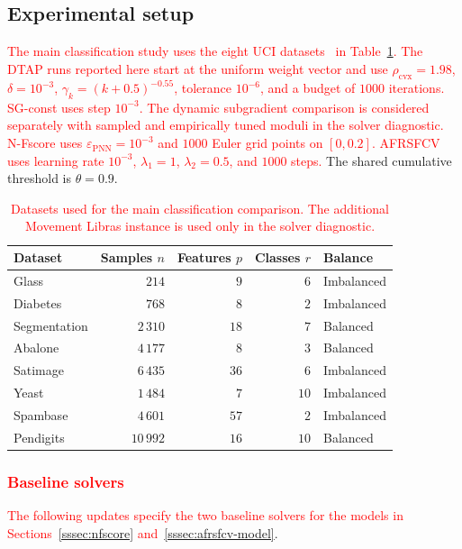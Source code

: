 \documentclass[]{interact}
\theoremstyle{plain}
\theoremstyle{definition}
\theoremstyle{remark}
\newcommand{\cvx}{\mathrm{cvx}}
\begin{document}
\subsection{Experimental setup}\label{ssec:setup}
\leavevmode\textcolor{red}{The main classification study uses the eight UCI datasets~\citep{kelly2023uci} in Table~\ref{tab:datasets}. The DTAP runs reported here start at the uniform weight vector and use $\rho_{\cvx}=1.98$, $\delta=10^{-3}$, $\gamma_k=(k+0.5)^{-0.55}$, tolerance $10^{-6}$, and a budget of $1000$ iterations. SG-const uses step $10^{-3}$. The dynamic subgradient comparison is considered separately with sampled and empirically tuned moduli in the solver diagnostic. N-Fscore uses $\varepsilon_{\mathrm{PNN}}=10^{-3}$ and $1000$ Euler grid points on $[0,0.2]$. AFRSFCV uses learning rate $10^{-3}$, $\lambda_1=1$, $\lambda_2=0.5$, and $1000$ steps.} The shared cumulative threshold is $\theta=0.9$.

\begin{table}[htbp]
\centering
\caption{\textcolor{red}{Datasets used for the main classification comparison. The additional Movement Libras instance is used only in the solver diagnostic.}}\label{tab:datasets}
\begin{tabular}{lrrrl}
\toprule
Dataset      & Samples $n$ & Features $p$ & Classes $r$ & Balance    \\
\midrule
Glass        & $214$       & $9$          & $6$         & Imbalanced \\
Diabetes     & $768$       & $8$          & $2$         & Imbalanced \\
Segmentation & $2\,310$    & $18$         & $7$         & Balanced   \\
Abalone      & $4\,177$    & $8$          & $3$         & Balanced   \\
Satimage     & $6\,435$    & $36$         & $6$         & Imbalanced \\
Yeast        & $1\,484$    & $7$          & $10$        & Imbalanced \\
Spambase     & $4\,601$    & $57$         & $2$         & Imbalanced \\
Pendigits    & $10\,992$   & $16$         & $10$        & Balanced   \\
\bottomrule
\end{tabular}
\end{table}
\subsubsection{\textcolor{red}{Baseline solvers}}\label{sssec:baselines}
\leavevmode\textcolor{red}{The following updates specify the two baseline solvers for the models in Sections~\ref{sssec:nfscore} and~\ref{sssec:afrsfcv-model}}.
\end{document}
